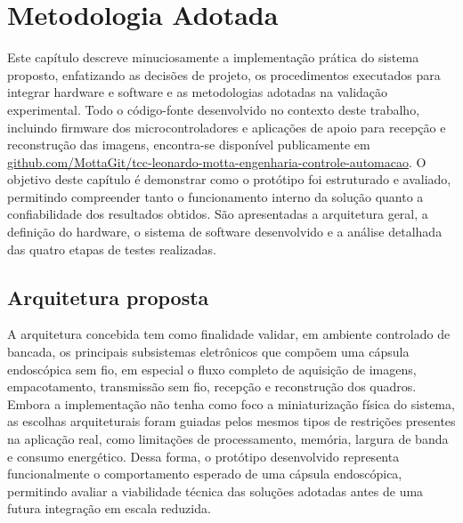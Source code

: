 \documentclass[repeatfields,xlists,xpacks,oneside]{ufrgscca}
\begin{document}




\chapter{Metodologia Adotada}

Este capítulo descreve minuciosamente a implementação prática do sistema proposto, enfatizando as decisões de projeto, os procedimentos executados para integrar hardware e software e as metodologias adotadas na validação experimental. Todo o código-fonte desenvolvido no contexto deste trabalho, incluindo firmware dos microcontroladores e aplicações de apoio para recepção e reconstrução das imagens, encontra-se disponível publicamente em \url{github.com/MottaGit/tcc-leonardo-motta-engenharia-controle-automacao}. O objetivo deste capítulo é demonstrar como o protótipo foi estruturado e avaliado, permitindo compreender tanto o funcionamento interno da solução quanto a confiabilidade dos resultados obtidos. São apresentadas a arquitetura geral, a definição do hardware, o sistema de software desenvolvido e a análise detalhada das quatro etapas de testes realizadas.


\section{Arquitetura proposta}

A arquitetura concebida tem como finalidade validar, em ambiente controlado de bancada, os principais subsistemas eletrônicos que compõem uma cápsula endoscópica sem fio, em especial o fluxo completo de aquisição de imagens, empacotamento, transmissão sem fio, recepção e reconstrução dos quadros. Embora a implementação não tenha como foco a miniaturização física do sistema, as escolhas arquiteturais foram guiadas pelos mesmos tipos de restrições presentes na aplicação real, como limitações de processamento, memória, largura de banda e consumo energético. Dessa forma, o protótipo desenvolvido representa funcionalmente o comportamento esperado de uma cápsula endoscópica, permitindo avaliar a viabilidade técnica das soluções adotadas antes de uma futura integração em escala reduzida.
\end{document}
